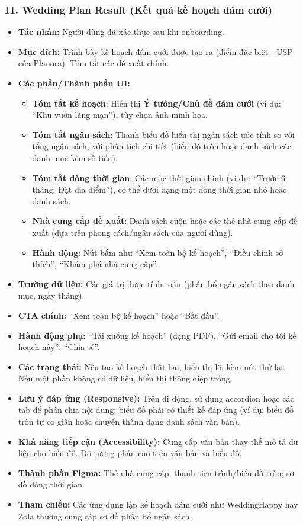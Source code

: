 \documentclass[11pt,a4paper]{article}
\begin{document}
\subsubsection{11. Wedding Plan Result (Kết quả kế hoạch đám cưới)}
\begin{itemize}
    \item \textbf{Tác nhân:} Người dùng đã xác thực sau khi onboarding.
    \item \textbf{Mục đích:} Trình bày kế hoạch đám cưới được tạo ra (điểm đặc biệt - USP của Planora). Tóm tắt các đề xuất chính.
    \item \textbf{Các phần/Thành phần UI:}
    \begin{itemize}
        \item \textbf{Tóm tắt kế hoạch}: Hiển thị \textbf{Ý tưởng/Chủ đề đám cưới} (ví dụ: ``Khu vườn lãng mạn''), tùy chọn ảnh minh họa.
        \item \textbf{Tóm tắt ngân sách}: Thanh biểu đồ hiển thị ngân sách ước tính so với tổng ngân sách, với phân tích chi tiết (biểu đồ tròn hoặc danh sách các danh mục kèm số tiền).
        \item \textbf{Tóm tắt dòng thời gian}: Các mốc thời gian chính (ví dụ: ``Trước 6 tháng: Đặt địa điểm''), có thể dưới dạng một dòng thời gian nhỏ hoặc danh sách.
        \item \textbf{Nhà cung cấp đề xuất}: Danh sách cuộn hoặc các thẻ nhà cung cấp đề xuất (dựa trên phong cách/ngân sách của người dùng).
        \item \textbf{Hành động}: Nút bấm như ``Xem toàn bộ kế hoạch'', ``Điều chỉnh sở thích'', ``Khám phá nhà cung cấp''.
    \end{itemize}
    \item \textbf{Trường dữ liệu:} Các giá trị được tính toán (phân bổ ngân sách theo danh mục, ngày tháng).
    \item \textbf{CTA chính:} ``Xem toàn bộ kế hoạch'' hoặc ``Bắt đầu''.
    \item \textbf{Hành động phụ:} ``Tải xuống kế hoạch'' (dạng PDF), ``Gửi email cho tôi kế hoạch này'', ``Chia sẻ''.
    \item \textbf{Các trạng thái:} Nếu tạo kế hoạch thất bại, hiển thị lỗi kèm nút thử lại. Nếu một phần không có dữ liệu, hiển thị thông điệp trống.
    \item \textbf{Lưu ý đáp ứng (Responsive):} Trên di động, sử dụng accordion hoặc các tab để phân chia nội dung; biểu đồ phải có thiết kế đáp ứng (ví dụ: biểu đồ tròn tự co giãn hoặc chuyển thành dạng danh sách văn bản).
    \item \textbf{Khả năng tiếp cận (Accessibility):} Cung cấp văn bản thay thế mô tả dữ liệu cho biểu đồ. Độ tương phản cao trên văn bản và biểu đồ.
    \item \textbf{Thành phần Figma:} Thẻ nhà cung cấp; thanh tiến trình/biểu đồ tròn; sơ đồ dòng thời gian.
    \item \textbf{Tham chiếu:} Các ứng dụng lập kế hoạch đám cưới như WeddingHappy hay Zola thường cung cấp sơ đồ phân bổ ngân sách.
\end{itemize}
\end{document}
